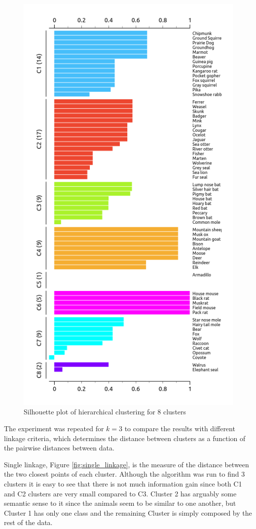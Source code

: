 \documentclass{article}
\begin{document}
\begin{figure}[htbp]
    \centering
    \includegraphics[scale=0.5]{k8.png}
    \caption{Silhouette plot of hierarchical clustering for 8 clusters}
    \label{fig:sil_8k}
\end{figure}

The experiment was repeated for $k = 3$ to compare the results with different linkage criteria, which determines the distance between clusters as a function of the pairwise distances between data.

Single linkage, Figure \ref{fig:single_linkage}, is the measure of the distance between the two closest points of each cluster. Although the algorithm was run to find 3 clusters it is easy to see that there is not much information gain since both C1 and C2 clusters are very small compared to C3. Cluster 2 has arguably some semantic sense to it since the animals seem to be similar to one another, but Cluster 1 has only one class and the remaining Cluster is simply composed by the rest of the data.
\end{document}
